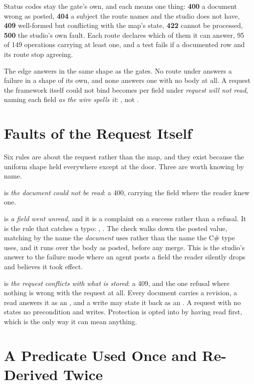 Status codes stay the gate's own, and each means one thing: \textbf{400} a
document wrong as posted, \textbf{404} a subject the route names and the studio
does not have, \textbf{409} well-formed but conflicting with the map's state,
\textbf{422} cannot be processed, \textbf{500} the studio's own fault. Each route
declares which of them it can answer, 95 of 149 operations carrying at least one,
and a test fails if a documented row and its route stop agreeing.

The edge answers in the same shape as the gates. No route under 
answers a failure in a shape of its own, and none answers one with no body at all.
A request the framework itself could not bind becomes  per field under
\emph{request will not read}, naming each field \emph{as the wire spells it}:
, not .

\section{Faults of the Request Itself}

Six rules are about the request rather than the map, and they exist because the
uniform shape held everywhere except at the door. Three are worth knowing by name.

 is \emph{the document could not be read}: a 400, carrying the field where
the reader knew one.

 is \emph{a field went unread}, and it is a complaint on a success rather
than a refusal. It is the rule that catches a typo: ,
. The check walks down the posted value, matching by the name the
\emph{document} uses rather than the name the C\# type uses, and it runs over the
body as posted, before any merge. This is the studio's answer to the failure mode
where an agent posts a field the reader silently drops and believes it took effect.

 is \emph{the request conflicts with what is stored}: a 409, and the one
refusal where nothing is wrong with the request at all. Every document carries a
revision, a read answers it as an , and a write may state it back as an
. A request with no  states no precondition and writes.
Protection is opted into by having read first, which is the only way it can mean
anything.

\section{A Predicate Used Once and Re-Derived Twice}

